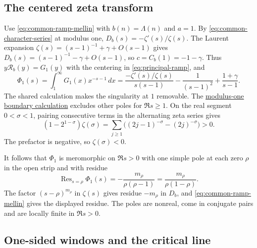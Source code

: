 \subsection{The centered zeta transform}

%
Use \eqref{eq:common-ramp-mellin} with \(b(n)=\Lambda(n)\) and \(a=1\).
By \eqref{eq:common-character-series} at modulus one,
\(D_b(s)=-\zeta'(s)/\zeta(s)\). The Laurent expansion
\(\zeta(s)=(s-1)^{-1}+\gamma+O(s-1)\) gives
\(D_b(s)=(s-1)^{-1}-\gamma+O(s-1)\), so \(c=C_b(1)=-1-\gamma\).
\cite[(25.2.4)--(25.2.5)]{dlmf}
Thus \(y\mathcal R_b(y)=G_1(y)\) with the centering in
\eqref{eq:principal-ramp}, and
\[
 \Phi_1(s)=\int_1^\infty G_1(x)x^{-s-1}\,dx
   =\frac{-\zeta'(s)/\zeta(s)}{s(s-1)}
                  -\frac{1}{(s-1)^2}+\frac{1+\gamma}{s-1}.
\]
The shared calculation makes the singularity at \(1\) removable.
The \hyperlink{proof.dirichlet-zero-free-line}{modulus-one boundary
calculation} excludes other poles for \(\Re s\ge1\).
On the real segment \(0<\sigma<1\), pairing consecutive terms
in the alternating zeta series gives
\[
 (1-2^{1-\sigma})\zeta(\sigma)
 =\sum_{j\ge1}\bigl((2j-1)^{-\sigma}-(2j)^{-\sigma}\bigr)>0.
\]
The prefactor is negative, so \(\zeta(\sigma)<0\).
\cite[(25.2.3)]{dlmf}

It follows that \(\Phi_1\) is meromorphic on \(\Re s>0\) with
one simple pole at each zero \(\rho\) in the open strip and with
residue
\begin{equation}
\label{eq:zeta-window-residue}
 \operatorname{Res}_{s=\rho}\Phi_1(s)
   =-\frac{m_\rho}{\rho(\rho-1)}
   =\frac{m_\rho}{\rho(1-\rho)} .
\end{equation}
The factor \((s-\rho)^{m_\rho}\) in \(\zeta(s)\) gives
residue \(-m_\rho\) in \(D_b\), and \eqref{eq:common-ramp-mellin}
gives the displayed residue. The poles are nonreal, come in conjugate
pairs and are locally finite in \(\Re s>0\).

\subsection{One-sided windows and the critical line}

